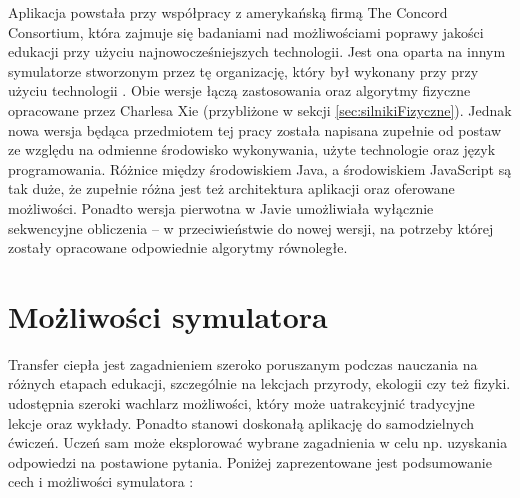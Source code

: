 Aplikacja powstała przy współpracy z amerykańską firmą The Concord Consortium,
która zajmuje się badaniami nad możliwościami poprawy jakości edukacji przy
użyciu najnowocześniejszych technologii. Jest ona oparta na innym symulatorze
stworzonym przez tę organizację, który był wykonany przy przy użyciu technologii
. Obie wersje łączą zastosowania oraz algorytmy fizyczne opracowane
przez Charlesa Xie (przybliżone w sekcji \ref{sec:silnikiFizyczne}). Jednak nowa
wersja będąca przedmiotem tej pracy została napisana zupełnie od postaw ze
względu na odmienne środowisko wykonywania, użyte technologie oraz język
programowania. Różnice między środowiskiem Java, a środowiskiem JavaScript są
tak duże, że zupełnie różna jest też architektura aplikacji oraz oferowane
możliwości. Ponadto wersja pierwotna w Javie umożliwiała wyłącznie sekwencyjne
obliczenia -- w przeciwieństwie do nowej wersji, na potrzeby której zostały
opracowane odpowiednie algorytmy równoległe.


\section{Możliwości symulatora}

Transfer ciepła jest zagadnieniem szeroko poruszanym podczas nauczania na
różnych etapach edukacji, szczególnie na lekcjach przyrody, ekologii czy też
fizyki. \en udostępnia szeroki wachlarz możliwości, który może uatrakcyjnić
tradycyjne lekcje oraz wykłady. Ponadto stanowi doskonałą aplikację do
samodzielnych ćwiczeń. Uczeń sam może eksplorować wybrane zagadnienia w celu np.
uzyskania odpowiedzi na postawione pytania. Poniżej zaprezentowane jest
podsumowanie cech i możliwości symulatora \en:

